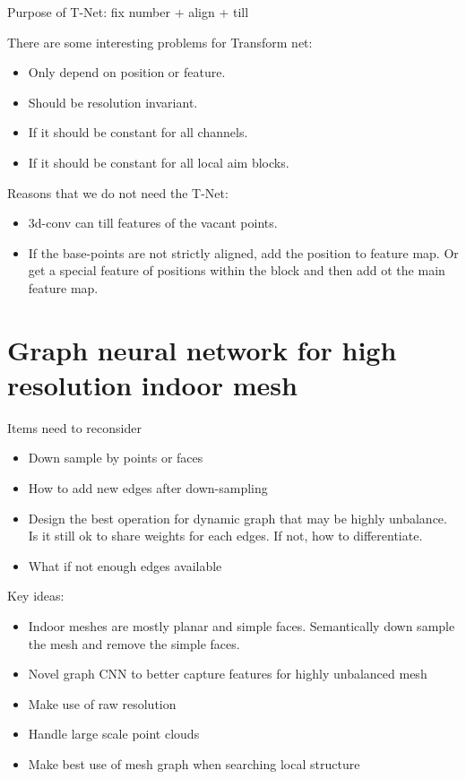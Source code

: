 \documentclass[,table,dvipsnames]{article}
\begin{document}
Purpose of T-Net: fix number + align + till \par
There are some interesting problems for Transform net:
\begin{itemize}
	\item Only depend on position or feature.
	\item Should be resolution invariant.
	\item If it should be constant for all channels.
	\item If it should be constant for all local aim blocks.
\end{itemize}
\par
Reasons that we do not need the T-Net:
\begin{itemize}
	\item 3d-conv can till features of the vacant points.
	\item If the base-points are not strictly aligned, add the position to feature map. Or get a special feature of positions within the block and then add ot the main feature map.
\end{itemize}
\par
{}

\newpage
\section{Graph neural network for high resolution indoor mesh}
Items need to reconsider
\begin{itemize}
	\item Down sample by points or faces
	\item How to add new edges after down-sampling
	\item Design the best operation for dynamic graph that may be highly unbalance. Is it still ok to share weights for each edges. If not, how to differentiate.
	\item What if not enough edges available
\end{itemize}

\par \noindent
Key ideas:
\begin{itemize}
	\item Indoor meshes are mostly planar and simple faces. Semantically down sample the mesh and remove the simple faces.
	\item Novel graph CNN to better capture features for highly unbalanced mesh 
	\item Make use of raw resolution
	\item Handle large scale point clouds
	\item Make best use of mesh graph when searching local structure
\end{itemize}
\end{document}
